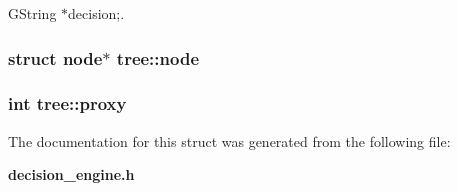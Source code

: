 GString $\ast$decision;. 

\subsubsection[{node}]{\setlength{\rightskip}{0pt plus 5cm}struct {\bf node}$\ast$ {\bf tree::node}\hspace{0.3cm}{\tt  [read]}}\label{structtree_6c28d102031ad20d64e1328d2d50646b}


\subsubsection[{proxy}]{\setlength{\rightskip}{0pt plus 5cm}int {\bf tree::proxy}}\label{structtree_193535f1343caccee1b53490753e5877}




The documentation for this struct was generated from the following file:\begin{CompactItemize}
\item 
{\bf decision\_\-engine.h}\end{CompactItemize}
